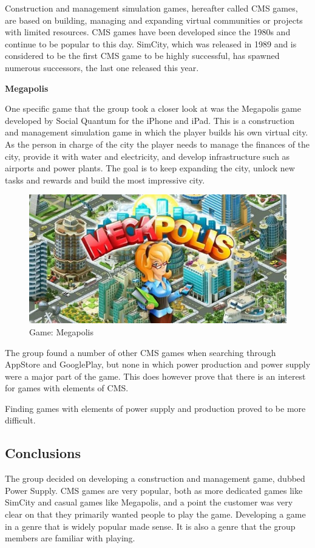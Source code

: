 Construction and management simulation games, hereafter called CMS games, are based on building, managing and expanding virtual communities or projects with limited resources. CMS games have been developed since the 1980s and continue to be popular to this day. SimCity, which was released in 1989 and is considered to be the first CMS game to be highly successful, has spawned numerous successors, the last one released this year. \cite{wikiCMS}

{\bf Megapolis}

One specific game that the group took a closer look at was the Megapolis game developed by Social Quantum for the iPhone and iPad. This is a construction and management simulation game in which the player builds his own virtual city. As the person in charge of the city the player needs to manage the finances of the city, provide it with water and electricity, and develop infrastructure such as airports and power plants. The goal is to keep expanding the city, unlock new tasks and rewards and build the most impressive city. \cite{megapolis}

\begin{figure}[H]
	\centering
	\includegraphics[width=\textwidth]{pictures/megapolis.jpg}
	\caption{Game: Megapolis}
\end{figure}

The group found a number of other CMS games when searching through AppStore and GooglePlay, but none in which power production and power supply were a major part of the game. This does however prove that there is an interest for games
with elements of CMS.

Finding games with elements of power supply and production proved to be more difficult.

\subsection{Conclusions}

The group decided on developing a construction and management game, dubbed Power Supply. CMS games are very popular, both as more dedicated games like SimCity and casual games like Megapolis, and a point the customer was very clear on that they primarily wanted people to play the game. Developing a game in a genre that is widely popular made sense. It is also a genre that the group members are familiar with playing.
